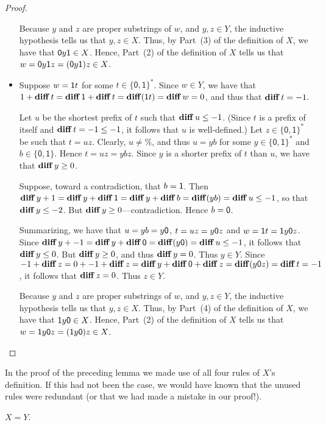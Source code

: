 \begin{proof}
\begin{itemize}
  Because $y$ and $z$ are proper substrings of $w$, and $y,z\in Y$,
  the inductive hypothesis tells us that $y,z\in X$.  Thus, by
  Part~(3) of the definition of $X$, we have that $\mathsf{0} y\mathsf{1}\in
  X$.  Hence, Part~(2) of the definition of $X$ tells us that
  $w=\mathsf{0} y\mathsf{1} z= (\mathsf{0} y\mathsf{1})z\in X$.

\item Suppose $w=\mathsf{1} t$ for some $t\in\{\mathsf{0,1}\}^*$. Since
  $w\in Y$, we have that
  $1+\mathbf{diff}\,t=\mathbf{diff}\,\mathsf{1}+\mathbf{diff}\,t=\mathbf{diff}(\mathsf{1} t)=\mathbf{diff}\,w=0$, and
  thus that $\mathbf{diff}\,t=-1$.

  Let $u$ be the shortest prefix of $t$ such that $\mathbf{diff}\,u\leq -1$.
  (Since $t$ is a prefix of itself and $\mathbf{diff}\,t=-1\leq -1$, it
  follows that $u$ is well-defined.)  Let $z\in\{\mathsf{0,1}\}^*$ be
  such that $t=uz$.  Clearly, $u\neq\%$, and thus $u=yb$ for some
  $y\in\{\mathsf{0,1}\}^*$ and $b\in\{\mathsf{0,1}\}$.  Hence
  $t=uz=ybz$.  Since $y$ is a shorter prefix of $t$ than $u$, we have
  that $\mathbf{diff}\,y\geq 0$.

  Suppose, toward a contradiction, that $b=\mathsf{1}$.  Then
  $\mathbf{diff}\,y+1=\mathbf{diff}\,y+\mathbf{diff}\,\mathsf{1}=\mathbf{diff}\,y+\mathbf{diff}\,b=\mathbf{diff}(yb)=\mathbf{diff}\,u\leq
  -1$, so that $\mathbf{diff}\,y\leq -2$.  But $\mathbf{diff}\,y\geq
  0$---contradiction.  Hence $b=\mathsf{0}$.

  Summarizing, we have that $u=yb=y\mathsf{0}$, $t=uz=y\mathsf{0} z$ and
  $w=\mathsf{1} t=\mathsf{1} y\mathsf{0} z$.  Since
  $\mathbf{diff}\,y+-1=\mathbf{diff}\,y+\mathbf{diff}\,\mathsf{0}=\mathbf{diff}(y\mathsf{0})=\mathbf{diff}\,u\leq
  -1$, it follows that $\mathbf{diff}\,y\leq 0$.  But $\mathbf{diff}\,y\geq 0$, and
  thus $\mathbf{diff}\,y=0$.  Thus $y\in Y$.  Since
  $-1+\mathbf{diff}\,z=0+-1+\mathbf{diff}\,z=\mathbf{diff}\,y+\mathbf{diff}\,\mathsf{0}+\mathbf{diff}\,z=\mathbf{diff}(y\mathsf{0}
  z)= \mathbf{diff}\,t=-1$, it follows that $\mathbf{diff}\,z = 0$.  Thus $z\in Y$.

  Because $y$ and $z$ are proper substrings of $w$, and $y,z\in Y$,
  the inductive hypothesis tells us that $y,z\in X$.  Thus, by
  Part~(4) of the definition of $X$, we have that $\mathsf{1} y\mathsf{0}\in
  X$.  Hence, Part~(2) of the definition of $X$ tells us that
  $w=\mathsf{1} y\mathsf{0} z= (\mathsf{1} y\mathsf{0})z\in X$.
\end{itemize}
\end{proof}

In the proof of the preceding lemma we made use of all four rules of
$X$'s definition.  If this had not been the case, we would have known
that the unused rules were redundant (or that we had made a mistake in
our proof!).

\begin{proposition}
\label{SSIProp2}
$X=Y$.
\end{proposition}

